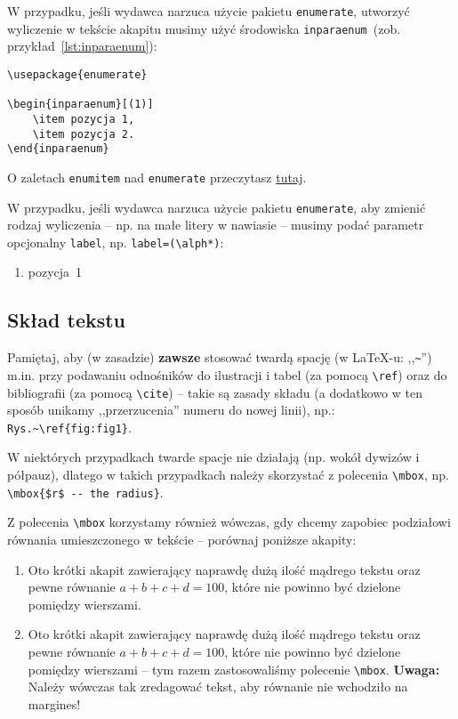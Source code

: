 \documentclass[pdftex,11pt,a4paper]{article}
\begin{document}
\par\smallskip

W przypadku, jeśli wydawca narzuca użycie pakietu \verb|enumerate|, utworzyć wyliczenie w tekście akapitu musimy użyć środowiska \lstinline|inparaenum|~(zob. przykład~\ref{lst:inparaenum}):
\begin{lstlisting}[label={lst:inparaenum}]
\usepackage{enumerate}

\begin{inparaenum}[(1)]
	\item pozycja 1,
	\item pozycja 2.
\end{inparaenum}
\end{lstlisting}
O zaletach \verb|enumitem| nad \verb|enumerate| przeczytasz \href{https://tex.stackexchange.com/a/222412/44391}{tutaj}.

\par\smallskip

W przypadku, jeśli wydawca narzuca użycie pakietu \lstinline|enumerate|, aby zmienić rodzaj wyliczenia -- np. na małe litery w nawiasie -- musimy podać parametr opcjonalny \lstinline|label|, np. \lstinline|label=(\alph*)|:
\begin{enumerate}[label=(\alph*)]
	\item pozycja~1
\end{enumerate}


\subsection{Skład tekstu}
\label{sub:typesetting}


Pamiętaj, aby (w zasadzie) \textbf{zawsze} stosować twardą spację (w \LaTeX-u: ,,\verb|~|'') m.in. przy podawaniu odnośników do ilustracji i tabel (za pomocą \lstinline|\ref|) oraz do bibliografii (za pomocą \lstinline|\cite|) -- takie są zasady składu (a dodatkowo w ten sposób unikamy ,,przerzucenia'' numeru do nowej linii), np.: \lstinline|Rys.~\ref{fig:fig1}|.

W niektórych przypadkach twarde spacje nie działają (np. wokół dywizów i półpauz), dlatego w takich przypadkach należy skorzystać z polecenia \lstinline|\mbox|, np. \lstinline|\mbox{$r$ -- the radius}|.

\par\smallskip

Z polecenia \lstinline|\mbox| korzystamy również wówczas, gdy chcemy zapobiec podziałowi równania umieszczonego w tekście -- porównaj poniższe akapity:
\begin{enumerate}
	\item Oto krótki akapit zawierający naprawdę dużą ilość mądrego tekstu oraz pewne równanie $a + b + c + d = 100$, które nie powinno być dzielone pomiędzy wierszami.
	\item Oto krótki akapit zawierający naprawdę dużą ilość mądrego tekstu oraz pewne równanie \mbox{$a + b + c + d = 100$}, które nie powinno być dzielone pomiędzy wierszami -- tym razem zastosowaliśmy polecenie \lstinline|\mbox|. \textbf{Uwaga:} Należy wówczas tak zredagować tekst, aby równanie nie wchodziło na margines!
\end{enumerate}
\end{document}
